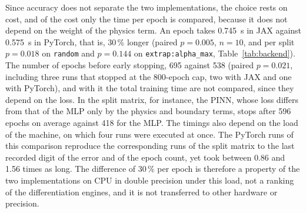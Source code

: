 Since accuracy does not separate the two implementations, the choice rests on cost, and of the cost only the time per epoch is compared, because it does not depend on the weight of the physics term. An epoch takes 0.745~s in JAX against 0.575~s in PyTorch, that is, 30\,\% longer (paired $p=0.005$, $n=10$, and per split $p=0.018$ on \texttt{random} and $p=0.144$ on \texttt{extrap:alpha\_max}, Table~\ref{tab:backend}). The number of epochs before early stopping, 695 against 538 (paired $p=0.021$, including three runs that stopped at the 800-epoch cap, two with JAX and one with PyTorch), and with it the total training time are not compared, since they depend on the loss. In the split matrix, for instance, the PINN, whose loss differs from that of the MLP only by the physics and boundary terms, stops after 596 epochs on average against 418 for the MLP. The timings also depend on the load of the machine, on which four runs were executed at once. The PyTorch runs of this comparison reproduce the corresponding runs of the split matrix to the last recorded digit of the error and of the epoch count, yet took between 0.86 and 1.56 times as long. %
The difference of 30\,\% per epoch is therefore a property of the two implementations on CPU in double precision under this load, not a ranking of the differentiation engines, and it is not transferred to other hardware or precision.


